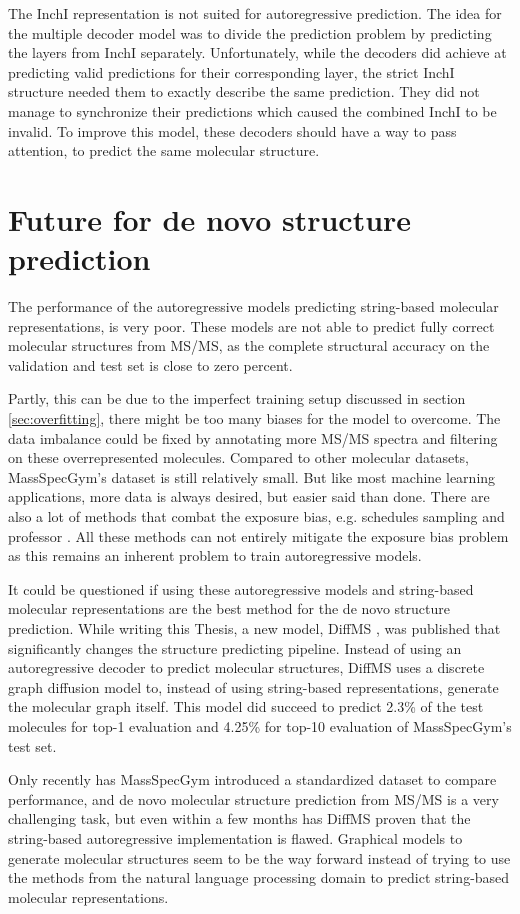 The InchI representation is not suited for autoregressive prediction.
The idea for the multiple decoder model was to divide the prediction problem by predicting the layers from InchI separately.
Unfortunately, while the decoders did achieve at predicting valid predictions for their corresponding layer, the strict InchI structure needed them to exactly describe the same prediction.
They did not manage to synchronize their predictions which caused the combined InchI to be invalid.
To improve this model, these decoders should have a way to pass attention, to predict the same molecular structure.

\section{Future for de novo structure prediction}

The performance of the autoregressive models predicting string-based molecular representations, is very poor.
These models are not able to predict fully correct molecular structures from \ac{MS/MS}, as the complete structural accuracy on the validation and test set is close to zero percent.

Partly, this can be due to the imperfect training setup discussed in section \ref{sec:overfitting}, there might be too many biases for the model to overcome.
The data imbalance could be fixed by annotating more \ac{MS/MS} spectra and filtering on these overrepresented molecules.
Compared to other molecular datasets, MassSpecGym's dataset is still relatively small.
But like most machine learning applications, more data is always desired, but easier said than done.
There are also a lot of methods that combat the exposure bias, e.g. schedules sampling \cite{bengio2015scheduled} and professor \cite{lamb2016professor}.
All these methods can not entirely mitigate the exposure bias problem as this remains an inherent problem to train autoregressive models.

It could be questioned if using these autoregressive models and string-based molecular representations are the best method for the de novo structure prediction.
While writing this Thesis, a new model, DiffMS \cite{bohde2025diffms}, was published that significantly changes the structure predicting pipeline.
Instead of using an autoregressive decoder to predict molecular structures, DiffMS uses a discrete graph diffusion model to, instead of using string-based representations, generate the molecular graph itself.
This model did succeed to predict 2.3\% of the test molecules for top-1 evaluation and 4.25\% for top-10 evaluation of MassSpecGym's test set.

Only recently has MassSpecGym introduced a standardized dataset to compare performance, and de novo molecular structure prediction from \ac{MS/MS} is a very challenging task,
but even within a few months has DiffMS proven that the string-based autoregressive implementation is flawed.
Graphical models to generate molecular structures seem to be the way forward instead of trying to use the methods from the natural language processing domain to predict string-based molecular representations.

